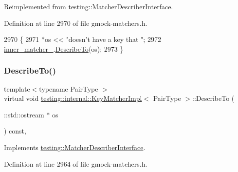 Reimplemented from \hyperlink{classtesting_1_1MatcherDescriberInterface_a2071afbc47097c4d1c0064275af34db0}{testing\+::\+Matcher\+Describer\+Interface}.



Definition at line 2970 of file gmock-\/matchers.\+h.


\begin{DoxyCode}
2970                                                         \{
2971     *os << \textcolor{stringliteral}{"doesn't have a key that "};
2972     \hyperlink{classtesting_1_1internal_1_1KeyMatcherImpl_a7b81235a36e13af4d4be7d08f07ba286}{inner\_matcher\_}.\hyperlink{classtesting_1_1internal_1_1MatcherBase_a7e0c883c7745e0d646463077ef1c1267}{DescribeTo}(os);
2973   \}
\end{DoxyCode}
\mbox{\label{classtesting_1_1internal_1_1KeyMatcherImpl_af024a1774c1aedae7b1dc532df7e27af}} 
\subsubsection{\texorpdfstring{Describe\+To()}{DescribeTo()}}
{\footnotesize\ttfamily template$<$typename Pair\+Type $>$ \\
virtual void \hyperlink{classtesting_1_1internal_1_1KeyMatcherImpl}{testing\+::internal\+::\+Key\+Matcher\+Impl}$<$ Pair\+Type $>$\+::Describe\+To (\begin{DoxyParamCaption}\item[{\+::std\+::ostream $\ast$}]{os }\end{DoxyParamCaption}) const\hspace{0.3cm}{\ttfamily [inline]}, {\ttfamily [virtual]}}



Implements \hyperlink{classtesting_1_1MatcherDescriberInterface_ad9f861588bd969b6e3e717f13bb94e7b}{testing\+::\+Matcher\+Describer\+Interface}.



Definition at line 2964 of file gmock-\/matchers.\+h.


